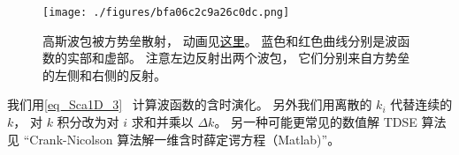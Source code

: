 
\begin{issues}
\issueDraft
\end{issues}


\begin{figure}[ht]
\centering
\texttt{[image: ./figures/bfa06c2c9a26c0dc.png]}
\caption{高斯波包被方势垒散射， 动画见\href{https://wuli.wiki/apps/FSBsct.html}{这里}。 蓝色和红色曲线分别是波函数的实部和虚部。 注意左边反射出两个波包， 它们分别来自方势垒的左侧和右侧的反射。} \label{fig_FSBsct_1}
\end{figure}

我们用\autoref{eq_Sca1D_3}~ 计算波函数的含时演化。 另外我们用离散的 $k_i$ 代替连续的 $k$， 对 $k$ 积分改为对 $i$ 求和并乘以 $\Delta{k}$。 另一种可能更常见的数值解 TDSE 算法见 “Crank-Nicolson 算法解一维含时薛定谔方程（Matlab)”。


